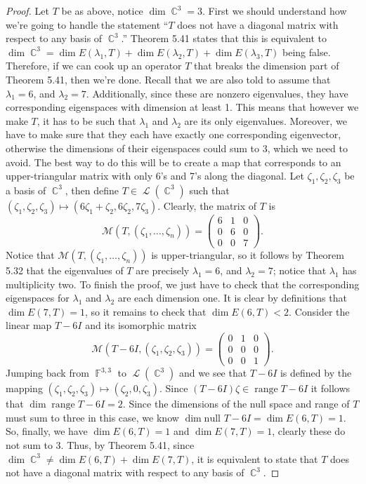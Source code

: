 \documentclass[letterpaper, 12pt]{amsart}
\DeclareMathOperator{\F}{\mathbb{F}}				%
\DeclareMathOperator{\C}{\mathbb{C}}				%
\DeclareMathOperator{\Ell}{\mathscr{L}}				%
\renewcommand{\null}{\text{null }}					%
\DeclareMathOperator{\range}{\text{range }}			%
\theoremstyle{definition}  							%
\begin{document}
		\begin{proof}
		Let $T$ be as above, notice $\dim \C^{3} = 3$.
		First we should understand how we're going to handle the statement ``$T$ does not have a diagonal matrix with respect to any basis of $\C^{3}$.''
		Theorem 5.41 states that this is equivalent to $\dim \C^{3} = \dim E(\lambda_{1},T) + \dim E(\lambda_{2},T) + \dim E(\lambda_{3},T)$ being false.
		Therefore, if we can cook up an operator $T$ that breaks the dimension part of Theorem 5.41, then we're done.
		Recall that we are also told to assume that $\lambda_{1} = 6$, and $\lambda_{2} = 7$.
		Additionally, since these are nonzero eigenvalues, they have corresponding eigenspaces with dimension at least 1.
		This means that however we make $T$, it has to be such that $\lambda_{1}$ and $\lambda_{2}$ are its only eigenvalues.
		Moreover, we have to make sure that they each have exactly one corresponding eigenvector, otherwise the dimensions of their eigenspaces could sum to 3, which we need to avoid.
		The best way to do this will be to create a map that corresponds to an upper-triangular matrix with only 6's and 7's along the diagonal.
		Let $\zeta_{1},\zeta_{2},\zeta_{3}$ be a basis of $\C^{3}$, then define $T \in \Ell(\C^{3})$ such that $(\zeta_{1},\zeta_{2},\zeta_{3}) \mapsto (6\zeta_{1} + \zeta_{2}, 6\zeta_{2}, 7\zeta_{3})$.
		Clearly, the matrix of $T$ is $$\mathcal{M}(T,(\zeta_{1}, \dots, \zeta_{n})) = \begin{pmatrix} 6 & 1 & 0 \\ 0 & 6 & 0 \\ 0 & 0 & 7 \end{pmatrix}.$$
		Notice that $\mathcal{M}(T,(\zeta_{1}, \dots, \zeta_{n}))$ is upper-triangular, so it follows by Theorem 5.32 that the eigenvalues of $T$ are precisely $\lambda_{1} = 6$, and $\lambda_{2} = 7$; notice that $\lambda_{1}$ has multiplicity two.
		To finish the proof, we just have to check that the corresponding eigenspaces for $\lambda_{1}$ and $\lambda_{2}$ are each dimension one.
		It is clear by definitions that $\dim E(7,T) = 1$, so it remains to check that $\dim E(6,T) < 2$.
		Consider the linear map $T - 6I$ and its isomorphic matrix $$\mathcal{M}(T - 6I, (\zeta_{1},\zeta_{2},\zeta_{3})) = \begin{pmatrix} 0 & 1 & 0 \\ 0 & 0 & 0 \\ 0 & 0 & 1 \end{pmatrix}.$$
		Jumping back from $\F^{3,3}$ to $\Ell(\C^3)$ and we see that $T - 6I$ is defined by the mapping $(\zeta_{1},\zeta_{2},\zeta_{3}) \mapsto (\zeta_{2},0,\zeta_{3})$.
		Since $(T - 6I)\zeta \in \range T - 6I$ it follows that $\dim \range T - 6I = 2$.
		Since the dimensions of the null space and range of $T$ must sum to three in this case, we know $\dim \null T - 6I = \dim E(6,T) = 1$.			
		So, finally, we have $\dim E(6,T) = 1$ and $\dim E(7,T) = 1$, clearly these do not sum to 3.
		Thus, by Theorem 5.41, since $\dim \C^3 \neq \dim E(6,T) + \dim E(7,T)$, it is equivalent to state that $T$ does not have a diagonal matrix with respect to any basis of $\C^{3}$.
		\end{proof}
\end{document}
